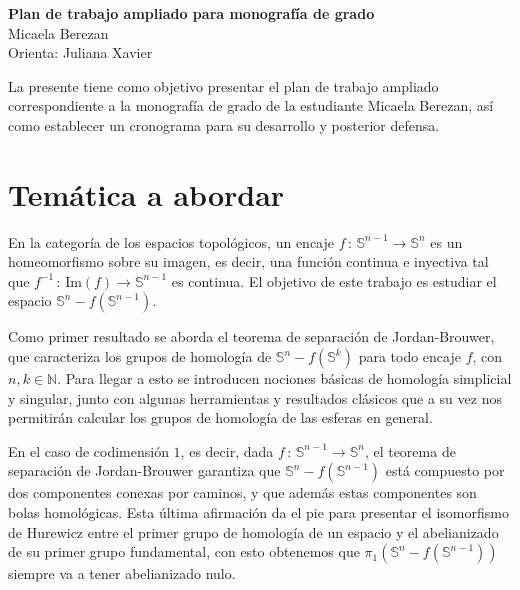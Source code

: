 \documentclass[11pt]{article}
\newcommand{\s}{\mathbb{S}}
\newcommand{\N}{\mathbb{N}}
\newcommand{\im}{\text{Im}}
\begin{document}
\begin{center}
    {\Large \textbf{Plan de trabajo ampliado para monografía de grado}}\\[1em]
    {\large Micaela Berezan}\\[0.5em]
    Orienta:  Juliana Xavier 
\end{center}

\vspace{1em}

La presente tiene como objetivo presentar el plan de trabajo ampliado correspondiente a
la monografía de grado de la estudiante Micaela Berezan, así como establecer un
cronograma para su desarrollo y posterior defensa.

\vspace{1em}

\section*{Temática a abordar}


En la categoría de los espacios topológicos, un encaje $f\,\colon\,\s^{n-1}\to\s^n$ es un homeomorfismo sobre su imagen, es decir, una función continua e inyectiva tal que $f^{-1}\,\colon\, \im(f)\to\s^{n-1}$ es continua. El objetivo de este trabajo es estudiar el espacio $\s^{n}-f(\s^{n-1})$.

Como primer resultado se aborda el teorema de separación de Jordan-Brouwer, que caracteriza los grupos de homología de $\s^{n}-f(\s^{k})$ para todo encaje $f$, con $n, k\in\N$. Para llegar a esto se introducen nociones básicas de homología simplicial y singular, junto con algunas herramientas y resultados clásicos que a su vez nos permitirán calcular los grupos de homología de las esferas en general.

En el caso de codimensión $1$, es decir, dada $f\,\colon\,\s^{n-1}\to\s^n$, el teorema de separación de Jordan-Brouwer garantiza que $\s^{n}-f(\s^{n-1})$ está compuesto por dos componentes conexas por caminos, y que además estas componentes son bolas homológicas. Esta última afirmación da el pie para presentar el isomorfismo de Hurewicz entre el primer grupo de homología de un espacio y el abelianizado de su primer grupo fundamental, con esto obtenemos que $\pi_1(\s^{n}-f(\s^{n-1}))$ siempre va a tener abelianizado nulo.
\end{document}
